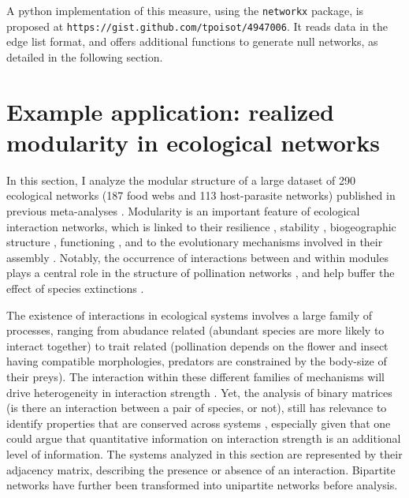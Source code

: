 \documentclass[12pt,oneside]{article}
\begin{document}
A python implementation of this measure, using the \texttt{networkx} package,
is proposed at \texttt{https://gist.github.com/tpoisot/4947006}. It reads data in the edge list
format, and offers additional functions to generate null networks, as detailed
in the following section.

\section{Example application: realized modularity in ecological networks}

In this section, I analyze the modular structure of a large dataset of 290
ecological networks (187 food webs and 113 host-parasite networks) published in
previous meta-analyses \cite{gravel_trophic_2011,poisot_dissimilarity_2012}.
Modularity is an important feature of ecological interaction networks, which is
linked to their resilience
\cite{fortuna_nestedness_2010,stouffer_compartmentalization_2011}, stability
\parencite{thebault_identifying_2012}, biogeographic structure
\cite{flores_multi-scale_2012}, functioning \cite{thebault_food-web_2003}, and
to the evolutionary mechanisms involved in their assembly
\cite{flores_statistical_2011}. Notably, the occurrence of interactions between
and within modules plays a central role in the structure of pollination
networks \parencite{olesen_modularity_2007}, and help buffer the effect of
species extinctions \parencite{stouffer_compartmentalization_2011}.

The existence of interactions in ecological systems involves
a large family of processes, ranging from abudance related
\cite{bluthgen_measuring_2006,canard_emergence_2012} (abundant
species are more likely to interact together) to trait related
\cite{bartomeus_understanding_2013} (pollination depends on the flower
and insect having compatible morphologies, predators are constrained by
the body-size of their preys). The interaction within these different
families of mechanisms will drive heterogeneity in interaction strength
\cite{berlow_quantifying_1999}. Yet, the analysis of binary matrices
(is there an interaction between a pair of species, or not), still
has relevance to identify properties that are conserved across systems
\cite{dunne_network_2006}, especially given that one could argue that
quantitative information on interaction strength is an additional level
of information. The systems analyzed in this section are represented
by their adjacency matrix, describing the presence or absence of an
interaction. Bipartite networks have further been transformed into unipartite
networks before analysis.
\end{document}
